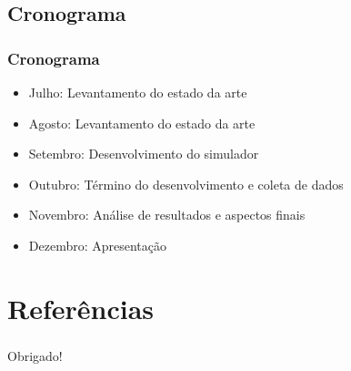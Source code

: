 \documentclass{beamer}
\begin{document}
\subsection{Cronograma}
\begin{frame}
    \frametitle{Cronograma}
    \begin{itemize}
        \item Julho: Levantamento do estado da arte
        \item Agosto: Levantamento do estado da arte
        \item Setembro: Desenvolvimento do simulador
        \item Outubro: Término do desenvolvimento e coleta de dados
        \item Novembro: Análise de resultados e aspectos finais
        \item Dezembro: Apresentação
    \end{itemize}
\end{frame}



\nocite{Stevenson09,Cordeiro04,Cormen94,Kurose2005,Stevens94,Tanenbaum03,Zimmermann80,Bae09,Jung08,Park97}

\section{Referências}


\begin{frame}
    \frametitle{ }
    \centerline{Obrigado!}
\end{frame}
\end{document}
